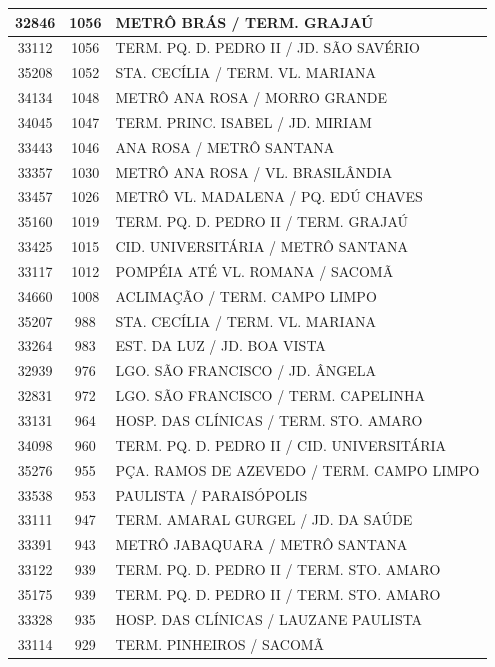 \documentclass[
	12pt,				%
	oneside,			%
	a4paper,			%
	english,			%
	brazil				%
	]{abntex2ppgsi}
\begin{document}
{{{\begin{apendicesenv}
\begin{longtable}{c|c|p{7cm}}
 \hline 
32846 &	1056 &	METRÔ BRÁS / TERM. GRAJAÚ \\ 
 \hline 
33112 &	1056 &	TERM. PQ. D. PEDRO II / JD. SÃO SAVÉRIO \\ 
 \hline 
35208 &	1052 &	STA. CECÍLIA / TERM. VL. MARIANA \\ 
 \hline 
34134 &	1048 &	METRÔ ANA ROSA / MORRO GRANDE \\ 
 \hline 
34045 &	1047 &	TERM. PRINC. ISABEL / JD. MIRIAM \\ 
 \hline 
33443 &	1046 &	ANA ROSA / METRÔ SANTANA \\ 
 \hline 
33357 &	1030 &	METRÔ ANA ROSA / VL. BRASILÂNDIA \\ 
 \hline 
33457 &	1026 &	METRÔ VL. MADALENA / PQ. EDÚ CHAVES \\ 
 \hline 
35160 &	1019 &	TERM. PQ. D. PEDRO II / TERM. GRAJAÚ \\ 
 \hline 
33425 &	1015 &	CID. UNIVERSITÁRIA / METRÔ SANTANA \\ 
 \hline 
33117 &	1012 &	POMPÉIA ATÉ VL. ROMANA / SACOMÃ \\ 
 \hline 
34660 &	1008 &	ACLIMAÇÃO / TERM. CAMPO LIMPO \\ 
 \hline 
35207 &	988 &	STA. CECÍLIA / TERM. VL. MARIANA \\ 
 \hline 
33264 &	983 &	EST. DA LUZ / JD. BOA VISTA \\ 
 \hline 
32939 &	976 &	LGO. SÃO FRANCISCO / JD. ÂNGELA \\ 
 \hline 
32831 &	972 &	LGO. SÃO FRANCISCO / TERM. CAPELINHA \\ 
 \hline 
33131 &	964 &	HOSP. DAS CLÍNICAS / TERM. STO. AMARO \\ 
 \hline 
34098 &	960 &	TERM. PQ. D. PEDRO II / CID. UNIVERSITÁRIA \\ 
 \hline 
35276 &	955 &	PÇA. RAMOS DE AZEVEDO / TERM. CAMPO LIMPO \\ 
 \hline 
33538 &	953 &	PAULISTA / PARAISÓPOLIS \\ 
 \hline 
33111 &	947 &	TERM. AMARAL GURGEL / JD. DA SAÚDE \\ 
 \hline 
33391 &	943 &	METRÔ JABAQUARA / METRÔ SANTANA \\ 
 \hline 
33122 &	939 &	TERM. PQ. D. PEDRO II / TERM. STO. AMARO \\ 
 \hline 
35175 &	939 &	TERM. PQ. D. PEDRO II / TERM. STO. AMARO \\ 
 \hline 
33328 &	935 &	HOSP. DAS CLÍNICAS / LAUZANE PAULISTA \\ 
 \hline 
33114 &	929 &	TERM. PINHEIROS / SACOMÃ \\ 

\end{longtable}
\end{apendicesenv}}}}
\end{document}
